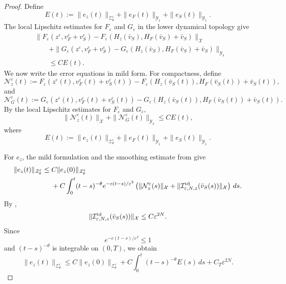 \documentclass[11pt]{article}
\theoremstyle{definition}
\theoremstyle{remark}
\numberwithin{equation}{section}
\begin{document}
\begin{proof}
Define
\[
E(t)
:=
\|e_z(t)\|_{\mathcal Z_\theta^\varepsilon}
+
\|e_F(t)\|_{\mathcal Y_1}
+
\|e_S(t)\|_{\mathcal Y_1}.
\]
The local Lipschitz estimates for \(F_\varepsilon\) and \(G_\varepsilon\) in
the lower dynamical topology give
\[
\begin{aligned}
&
\|F_\varepsilon(z^\varepsilon,v_F^\varepsilon+v_S^\varepsilon)
-
F_\varepsilon(H_z(\bar v_S),H_F(\bar v_S)+\bar v_S)\|_{\mathcal X}
\\
&\qquad
+
\|G_\varepsilon(z^\varepsilon,v_F^\varepsilon+v_S^\varepsilon)
-
G_\varepsilon(H_z(\bar v_S),H_F(\bar v_S)+\bar v_S)\|_{\mathcal Y_\delta}
\\
&\qquad\le
C E(t).
\end{aligned}
\]
We now write the error equations in mild form. For compactness, define
\[
\mathcal N_z^\varepsilon(t)
:=
F_\varepsilon(z^\varepsilon(t),v_F^\varepsilon(t)+v_S^\varepsilon(t))
-
F_\varepsilon(H_z(\bar v_S(t)),H_F(\bar v_S(t))+\bar v_S(t)),
\]
and
\[
\mathcal N_G^\varepsilon(t)
:=
G_\varepsilon(z^\varepsilon(t),v_F^\varepsilon(t)+v_S^\varepsilon(t))
-
G_\varepsilon(H_z(\bar v_S(t)),H_F(\bar v_S(t))+\bar v_S(t)).
\]
By the local Lipschitz estimates for \(F_\varepsilon\) and \(G_\varepsilon\),
\[
\|\mathcal N_z^\varepsilon(t)\|_{\mathcal X}
+
\|\mathcal N_G^\varepsilon(t)\|_{\mathcal Y_\delta}
\le
C E(t),
\]
where
\[
E(t)
:=
\|e_z(t)\|_{\mathcal Z_\theta^\varepsilon}
+
\|e_F(t)\|_{\mathcal Y_1}
+
\|e_S(t)\|_{\mathcal Y_1}.
\]

For \(e_z\), the mild formulation and the smoothing estimate from  give
\[
\begin{aligned}
\|e_z(t)\|_{\mathcal Z_\theta^\varepsilon}
\le{}&
C\|e_z(0)\|_{\mathcal Z_\theta^\varepsilon}
\\
&+
C\int_0^t
(t-s)^{-\theta}e^{-c(t-s)/\varepsilon^2}
\left(
\|\mathcal N_z^\varepsilon(s)\|_{\mathcal X}
+
\|\mathcal I_{\varepsilon,N,z}^{\rm td}(\bar v_S(s))\|_{\mathcal X}
\right)\,ds .
\end{aligned}
\]
By ,
\[
\|\mathcal I_{\varepsilon,N,z}^{\rm td}(\bar v_S(s))\|_{\mathcal X}
\le
C\varepsilon^{2N}.
\]
Since
\[
e^{-c(t-s)/\varepsilon^2}\le 1
\]
and \((t-s)^{-\theta}\) is integrable on \((0,T)\), we obtain
\[
\|e_z(t)\|_{\mathcal Z_\theta^\varepsilon}
\le
C\|e_z(0)\|_{\mathcal Z_\theta^\varepsilon}
+
C\int_0^t
(t-s)^{-\theta}E(s)\,ds
+
C_T\varepsilon^{2N}.
\]


\end{proof}
\end{document}

